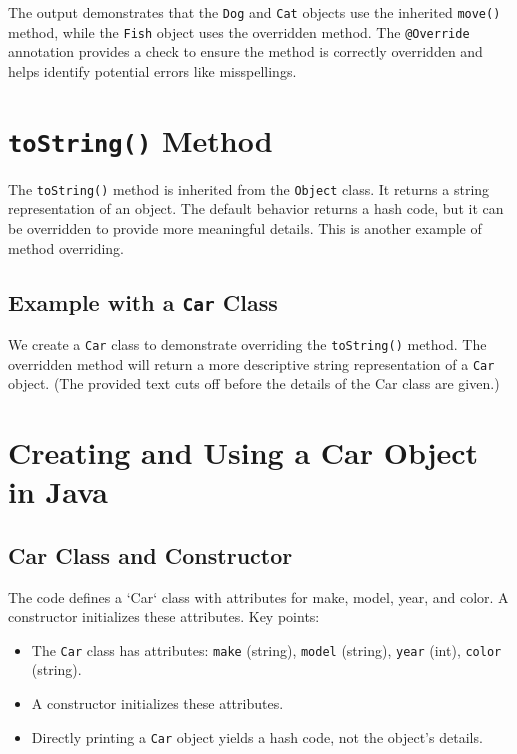 \documentclass{article}
\begin{document}
The output demonstrates that the \texttt{Dog} and \texttt{Cat} objects use the inherited \texttt{move()} method, while the \texttt{Fish} object uses the overridden method. The \texttt{@Override} annotation provides a check to ensure the method is correctly overridden and helps identify potential errors like misspellings.


\section{\texttt{toString()} Method}

The \texttt{toString()} method is inherited from the \texttt{Object} class. It returns a string representation of an object.  The default behavior returns a hash code, but it can be overridden to provide more meaningful details.  This is another example of method overriding.

\subsection{Example with a \texttt{Car} Class}

We create a \texttt{Car} class to demonstrate overriding the \texttt{toString()} method.  The overridden method will return a more descriptive string representation of a \texttt{Car} object.  (The provided text cuts off before the details of the Car class are given.)


\section{Creating and Using a Car Object in Java}

\subsection{Car Class and Constructor}

The code defines a `Car` class with attributes for make, model, year, and color.  A constructor initializes these attributes.  Key points:

\begin{itemize}
    \item The \texttt{Car} class has attributes: \texttt{make} (string), \texttt{model} (string), \texttt{year} (int), \texttt{color} (string).
    \item A constructor initializes these attributes.
    \item  Directly printing a \texttt{Car} object yields a hash code, not the object's details.
\end{itemize}
\end{document}
